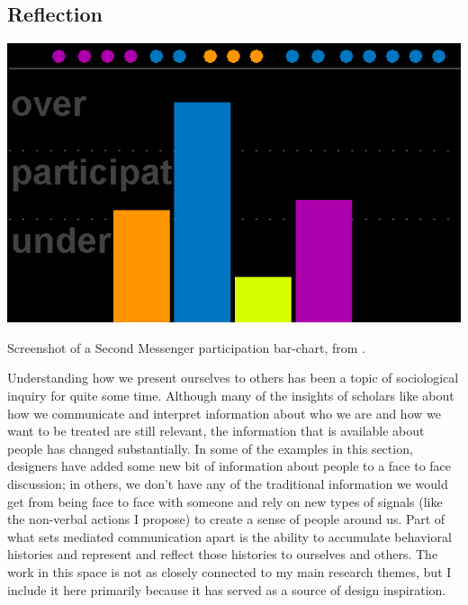 
\subsection{Reflection}

\begin{marginfigure}
	\includegraphics{figures/second-messenger.png}
	\caption{Screenshot of a Second Messenger participation bar-chart, from \citep{DiMicco:2007ie}.}
	\label{fig:second-messenger}
\end{marginfigure}





Understanding how we present ourselves to others has been a topic of sociological inquiry for quite some time. Although many of the insights of scholars like \citet{goffman_presentation_1959} about how we communicate and interpret information about who we are and how we want to be treated are still relevant, the information that is available about people has changed substantially. In some of the examples in this section, designers have added some new bit of information about people to a face to face discussion; in others, we don't have any of the traditional information we would get from being face to face with someone and rely on new types of signals (like the non-verbal actions I propose) to create a sense of people around us. Part of what sets mediated communication apart is the ability to accumulate behavioral histories and represent and reflect those histories to ourselves and others. The work in this space is not as closely connected to my main research themes, but I include it here primarily because it has served as a source of design inspiration. 


